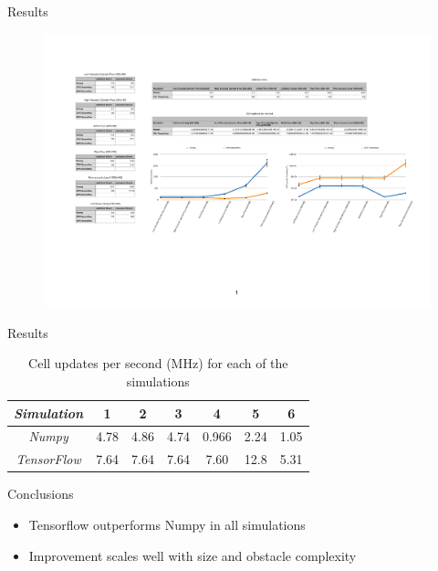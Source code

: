 \documentclass{beamer}
\begin{document}
\begin{frame}{Results}

\begin{figure}[H] 
	\centering
	\label{videoCuts}
	\includegraphics[width=4.5in]{Diagrams/FreqGraph.pdf}
\end{figure}

\end{frame}

\begin{frame}{Results}

\begin{table}[H]
\caption{Cell updates per second (MHz) for each of the simulations}
\begin{center}
\begin{tabular}{c||c|c|c|c|c|c}
\emph{Simulation} & 1 & 2 & 3 & 4 & 5 & 6\\
\hline
\hline
\emph{Numpy} & 4.78 & 4.86 & 4.74 & 0.966 & 2.24 & 1.05 \\
\hline
\emph{TensorFlow} & 7.64 & 7.64 & 7.64 & 7.60 & 12.8 & 5.31 \\
\hline
\end{tabular}
\end{center}
\end{table}

\end{frame}

\begin{frame}{Conclusions}

\begin{itemize}
    \item Tensorflow outperforms Numpy in all simulations
    \item Improvement scales well with size and obstacle complexity
\end{itemize}

\end{frame}
\end{document}
